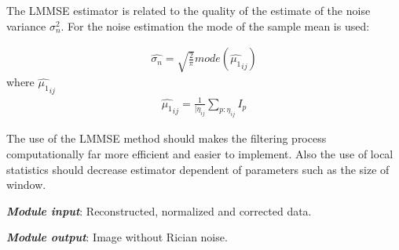 The LMMSE estimator is related to the quality of the estimate of the
noise variance $\sigma_{n}^{2}$. For the noise estimation the mode
of the sample mean is used:

\begin{equation}
\begin{aligned}\widehat{\sigma_{n}}=\sqrt{\frac{2}{\pi}}mode(\widehat{\mu_{1}}_{ij})\end{aligned}
\label{m4eq4}
\end{equation}
where $\widehat{\mu_{1}}_{ij}$ 
\begin{equation}
\begin{aligned}\widehat{\mu_{1}}_{ij}=\frac{1}{|\eta_{ij}}\sum_{p\colon\eta_{ij}}I_{p}\end{aligned}
\label{m4eq5}
\end{equation}

The use of the LMMSE method should makes the filtering process computationally
far more efficient and easier to implement. Also the use of local
statistics should decrease estimator dependent of parameters such
as the size of window.

\textbf{\emph{Module input}}: Reconstructed, normalized and corrected
data.

\textbf{\emph{Module output}}: Image without Rician noise.